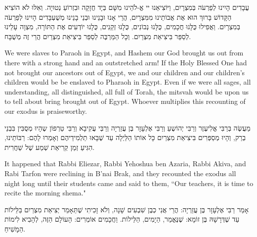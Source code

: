 עֲבָדִים הָיִינוּ לְפַרְעֹה בְּמִצְרָיִם, וַיּוֹצִיאֵנוּ יי אֱ-לֹהֵינוּ מִשָּׁם בְּיָד חֲזָקָה וּבִזְרוֹעַ נְטוּיָה. וְאִלּוּ לֹא הוֹצִיא הַקָּדוֹשׁ בָּרוּךְ הוּא אֶת אֲבוֹתֵינוּ מִמִּצְרָיִם, הֲרֵי אָנוּ וּבָנֵינוּ וּבְנֵי בָנֵינוּ מְשֻׁעְבָּדִים הָיִינוּ לְפַרְעֹה בְּמִצְרָיִם. וַאֲפִילוּ כֻּלָּנוּ חֲכָמִים, כֻּלָּנוּ נְבוֹנִים, כֻּלָנוּ זְקֵנִים, כֻּלָנוּ יוֹדְעִים אֶת הַתּוֹרָה, מִצְוָה עָלֵינוּ לְסַפֵּר בִּיצִיאַת מִצְרַיִם. וְכָל הַמַּרְבֶּה לְסַפֵּר בִּיצִיאַת מִצְרַיִם הֲרֵי זֶה מְשֻׁבָּח.

\begin{english}
We were slaves to Paraoh in Egypt, and Hashem our God brought us out from there with a strong hand and an outstretched arm! If the Holy Blessed One had not brought our ancestors out of Egypt, we and our children and our children's children would be be enslaved to Pharaoh in Egypt. Even if we were all sages, all understanding, all distinguished, all full of Torah, the mitsvah would be upon us to tell about bring brought out of Egypt. Whoever multiplies this recounting of our exodus is praiseworthy.
\end{english}

\break

מַעֲשֶׂה בְּרַבִּי אֱלִיעֶזֶר וְרַבִּי יְהוֹשֻעַ וְרַבִּי אֶלְעָזָר בֶּן עֲזַרְיָה וְרַבְּי עֲקִיבָא וְרַבִּי טַרְפוֹן שֶהָיוּ מְסֻבִּין בִּבְנֵי בְרַק, וְהָיוּ מְסַפְּרִים בִּיצִיאַת מִצְרַיִם כָּל אוֹתוֹ הַלַּיְלָה עַד שֶׁבָּאוּ תַלְמִידֵיהֶם וְאָמְרוּ לָהֶם: רַבּוֹתֵינוּ, הִגִּיעַ זְמַן קְרִיאַת שְׁמַע שֶׁל שַׁחֲרִית.

\begin{english}
It happened that Rabbi Eliezar, Rabbi Yehoshua ben Azaria, Rabbi Akiva, and Rabi Tarfon were reclining in B'nai Brak, and they recounted the exodus all night long until their students came and said to them, ``Our teachers, it is time to recite the morning shema."
\end{english}

\vspace{1em}

אָמַר רַבִּי אֶלְעָזָר בֶּן עֲזַרְיָה: הֲרֵי אֲנִי כְבֶן שִׁבְעִים שָׁנָה, וְלֹא זָכִיתִי שֶׁתֵּאָמֵר יְצִיאַת מִצְרַיִם בַּלֵּילוֹת עַד שֶׁדְּרָשָׁהּ בֶּן זוֹמָא: שֶׁנֶּאֱמַר,
הַיָמִים,
הַלֵּילוֹת. וַחֲכָמִים אוֹמְרִים: 
הָעוֹלָם הַזֶּה, 
לְהָבִיא לִימוֹת הַמָשִׁיחַ.

